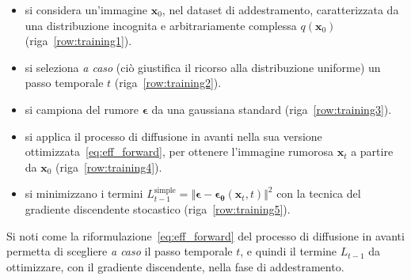 \begin{itemize}
\item si considera un'immagine $\mathbf{x}_0$, nel dataset di addestramento, caratterizzata da una distribuzione incognita e arbitrariamente complessa $q(\mathbf{x}_0)$ (riga~\ref{row:training1}).
\item si seleziona \emph{a caso} (ciò giustifica il ricorso alla distribuzione uniforme) un passo temporale $t$ (riga~\ref{row:training2}).
\item si campiona del rumore $\bm{\epsilon}$ da una gaussiana standard (riga~\ref{row:training3}).
\item si applica il processo di diffusione in avanti nella sua versione ottimizzata~\eqref{eq:eff_forward}, per ottenere l'immagine rumorosa 
$\mathbf{x}_t$ a partire da $\mathbf{x}_0$ (riga~\ref{row:training4}).
\item si minimizzano i termini $L_{t-1}^{\text{simple}}=\Vert \bm{\epsilon}-\bm{\epsilon_{\theta}}(\mathbf{x}_t,t)\Vert^2$ 
con la tecnica del gradiente discendente stocastico (riga~\ref{row:training5}).
\end{itemize}

\begin{oss}
    Si noti come la riformulazione~\eqref{eq:eff_forward}  del processo di diffusione in avanti 
    permetta di scegliere \emph{a caso} il passo temporale $t$, e quindi il termine $L_{t-1}$ da ottimizzare, con il gradiente discendente, nella fase di 
    addestramento. 
\end{oss}









